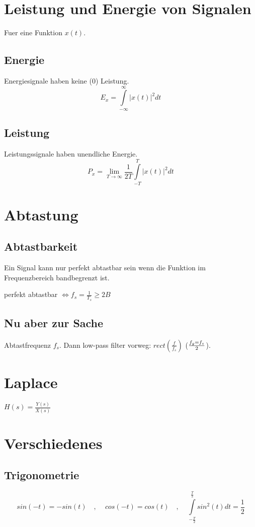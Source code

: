 \documentclass[10pt,a4paper]{article}
\begin{document}
\section{Leistung und Energie von Signalen}
Fuer eine Funktion $x(t)$.
\subsection{Energie}
Energiesignale haben keine ($0$) Leistung.
\[
E_x = \int\limits_{-\infty}^\infty \left| x(t) \right|^2 dt
\]
\subsection{Leistung}
Leistungssignale haben unendliche Energie.
\[
P_x = \lim\limits_{T \rightarrow \infty} \frac{1}{2T} \int\limits_{-T}^T \left| x(t) \right|^2 dt
\]

\section{Abtastung}
\subsection{Abtastbarkeit}
Ein Signal kann nur perfekt abtastbar sein wenn die Funktion im Frequenzbereich bandbegrenzt ist.

perfekt abtastbar $\Leftrightarrow f_s = \frac{1}{T_s} \geq 2B$

\subsection{Nu aber zur Sache}
Abtastfrequenz $f_s$. Dann low-pass filter vorweg: $rect\left(\frac{f}{f_s}\right)$ ($f_g = f_s \over 2$).

\section{Laplace}
$H(s) = \frac{Y(s)}{X(s)}$

\section{Verschiedenes}
\subsection{Trigonometrie}
\[sin(-t) = -sin(t) \,\,\,\,\,\,,\,\,\,\,\,\,\, cos(-t) = cos(t) \,\,\,\,\,\,,\,\,\,\,\,\,\, \int\limits_{- \frac{T}{2}}^{\frac{T}{2}} sin^2(t) dt = \frac{1}{2}\]
\end{document}
